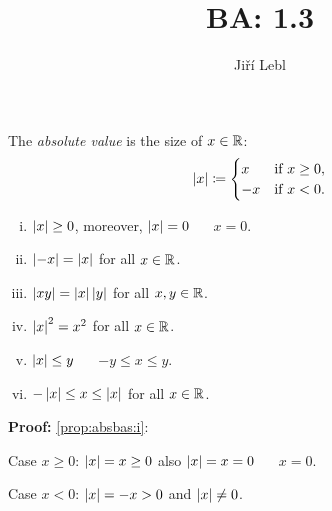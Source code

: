 \documentclass[10pt,aspectratio=149]{beamer}
\author{Ji\v{r}\'i Lebl}
\institute[OSU]{%
Departemento pri Matematiko de Oklahoma {\^S}tata Universitato}
\title{BA: 1.3}
\date{}
\begin{document}
\begin{frame}
\titlepage
\end{frame}

\begin{frame}
The \emph{absolute value} is the size of $x \in {\mathbb{R}}$:
\[
\left\lvert {x} \right\rvert \coloneqq
\begin{cases}
x & \text{if } x \geq 0, \\
-x & \text{if } x < 0 .
\end{cases}
\]

\pause

\begin{proposition}
\begin{enumerate}[(i)]
\item \label{prop:absbas:i} $\left\lvert {x} \right\rvert \geq 0$, \quad moreover, $\left\lvert {x} \right\rvert=0$ ~\iffif~ $x = 0$.
\item \pause \label{prop:absbas:ii} $\left\lvert {-x} \right\rvert = \left\lvert {x} \right\rvert$ for all $x \in {\mathbb{R}}$.
\item \pause \label{prop:absbas:iii} $\left\lvert {xy} \right\rvert = \left\lvert {x} \right\rvert\left\lvert {y} \right\rvert$ for all $x,y \in {\mathbb{R}}$.
\item \pause \label{prop:absbas:iv} $\left\lvert {x} \right\rvert^2 = x^2$ for all $x \in {\mathbb{R}}$.
\item \pause \label{prop:absbas:v} $\left\lvert {x} \right\rvert \leq y$ ~\iffif~ $-y \leq x \leq y$.
\item \pause \label{prop:absbas:vi} $-\left\lvert {x} \right\rvert \leq x \leq \left\lvert {x} \right\rvert$ for all $x \in {\mathbb{R}}$.
\end{enumerate}
\end{proposition}

\pause

\textbf{Proof:}
\eqref{prop:absbas:i}:

Case $x \geq 0$:
\quad
\pause
$\left\lvert {x} \right\rvert = x \geq 0$
\quad
\pause
also $\left\lvert {x} \right\rvert = x = 0$ ~\iffif~ $x=0$.

\pause
Case $x < 0$:
\quad
$\left\lvert {x} \right\rvert = -x > 0$ \quad \pause and $\left\lvert {x} \right\rvert \not= 0$.

\end{frame}
\end{document}
